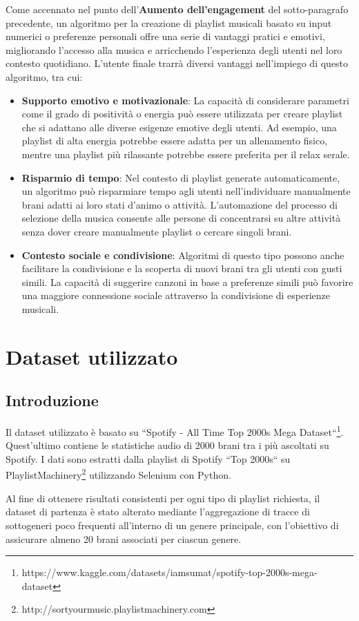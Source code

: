 \documentclass[12pt, a4paper]{article}
\begin{document}
Come accennato nel punto dell'\textbf{Aumento dell'engagement} del sotto-paragrafo precedente, un algoritmo per la creazione di playlist musicali basato su input numerici o preferenze personali offre una serie di vantaggi pratici e emotivi, migliorando l'accesso alla musica e arricchendo l'esperienza degli utenti nel loro contesto quotidiano. L'utente finale trarrà diversi vantaggi nell'impiego di questo algoritmo, tra cui:
\begin{itemize}
\item \textbf{Supporto emotivo e motivazionale}: La capacità di considerare parametri come il grado di positività o energia può essere utilizzata per creare playlist che si adattano alle diverse esigenze emotive degli utenti. Ad esempio, una playlist di alta energia potrebbe essere adatta per un allenamento fisico, mentre una playlist più rilassante potrebbe essere preferita per il relax serale.
\item \textbf{Risparmio di tempo}: Nel contesto di playlist generate automaticamente, un algoritmo può risparmiare tempo agli utenti nell'individuare manualmente brani adatti ai loro stati d'animo o attività. L'automazione del processo di selezione della musica consente alle persone di concentrarsi su altre attività senza dover creare manualmente playlist o cercare singoli brani.
\item \textbf{Contesto sociale e condivisione}: Algoritmi di questo tipo possono anche facilitare la condivisione e la scoperta di nuovi brani tra gli utenti con gusti simili. La capacità di suggerire canzoni in base a preferenze simili può favorire una maggiore connessione sociale attraverso la condivisione di esperienze musicali.
\end{itemize}

\newpage
\section{Dataset utilizzato}

\subsection{Introduzione}

Il dataset utilizzato è basato su “Spotify - All Time Top 2000s Mega Dataset“\footnote{https://www.kaggle.com/datasets/iamsumat/spotify-top-2000s-mega-dataset}. Quest'ultimo contiene le statistiche audio di 2000 brani tra i più ascoltati su Spotify. I dati sono estratti dalla playlist di Spotify “Top 2000s“ su PlaylistMachinery\footnote{http://sortyourmusic.playlistmachinery.com} utilizzando Selenium con Python.\par
Al fine di ottenere risultati consistenti per ogni tipo di playlist richiesta, il dataset di partenza è stato alterato mediante l'aggregazione di tracce di sottogeneri poco frequenti all'interno di un genere principale, con l'obiettivo di assicurare almeno 20 brani associati per ciascun genere.
\end{document}
